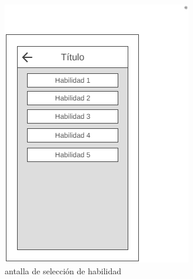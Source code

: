 \begin{figure}[H]
    \centering
    \includegraphics[scale=0.3]{Figures/Mockups/Mock_SeleccionHabilidad.png}
    \caption{antalla de selección de habilidad}
    \label{SeleccionHabilidad}    
\end{figure}

